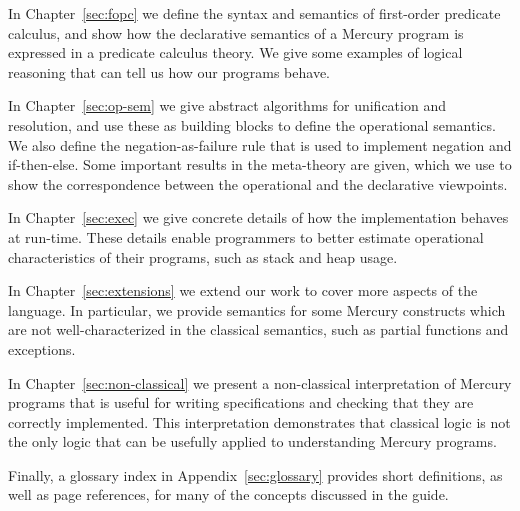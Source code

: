 In Chapter~\ref{sec:fopc} we define
the syntax and semantics of first-order predicate calculus,
and show how the declarative semantics of a Mercury program
is expressed in a predicate calculus theory.
We give some examples of logical reasoning
that can tell us how our programs behave.

In Chapter~\ref{sec:op-sem}
we give abstract algorithms for unification and resolution,
and use these as building blocks to define the operational semantics.
We also define the negation-as-failure rule
that is used to implement negation and if-then-else.
Some important results in the meta-theory are given,
which we use to show the correspondence between
the operational and the declarative viewpoints.

In Chapter~\ref{sec:exec}
we give concrete details of how the implementation
behaves at run-time.
These details enable programmers to better estimate
operational characteristics of their programs,
such as stack and heap usage.

In Chapter~\ref{sec:extensions} we extend our work
to cover more aspects of the language.
In particular,
we provide semantics for some Mercury constructs
which are not well-characterized in the classical semantics,
such as partial functions and exceptions.

In Chapter~\ref{sec:non-classical} we present
a non-classical interpretation of Mercury programs
that is useful for writing specifications
and checking that they are correctly implemented.
This interpretation demonstrates that
classical logic is not the only logic
that can be usefully applied to understanding Mercury programs.

Finally,
a glossary index in Appendix~\ref{sec:glossary}
provides short definitions,
as well as page references,
for many of the concepts discussed in the guide.

